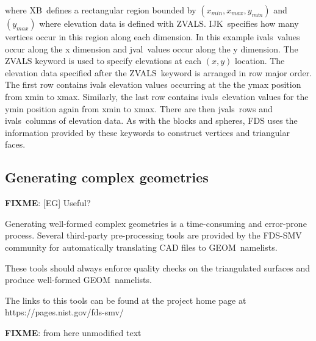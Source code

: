 \documentclass[12pt]{article}
\begin{document}
\noindent where {\ct XB}\ defines a rectangular region bounded by $(x_{min}, x_{max}, y_{min})$ and $(y_{max})$
where elevation data is defined with {\ct ZVALS}.
{\ct IJK}\ specifies how many vertices occur in this region along each dimension.
In this example {\ct ivals}\ values occur along the x dimension and {\ct jval}\ values occur along the y dimension.
The {\ct ZVALS} keyword is used to specify elevations at each $(x,y)$ location.
The elevation data specified after the {\ct ZVALS}\ keyword is arranged in row major order.
The first row contains {\ct ivals} elevation values occurring at the the ymax position from xmin to xmax.
Similarly, the last row contains
{\ct ivals}\ elevation values for the ymin position again from xmin to xmax.
There are then {\ct jvals}\ rows and {\ct ivals}\ columns of elevation data.
As with the blocks and spheres, FDS uses the information provided by these keywords to construct
vertices and triangular faces.

\subsection{Generating complex geometries}

\textbf{FIXME}: [EG] Useful?

Generating well-formed complex geometries is a time-consuming and error-prone process.
Several third-party pre-processing tools are provided by the FDS-SMV community for automatically translating CAD files to {\ct GEOM}\ namelists.

These tools should always enforce quality checks on the triangulated surfaces and produce well-formed {\ct GEOM}\ namelists.

The links to this tools can be found at the project home page at https://pages.nist.gov/fds-smv/





\textbf{FIXME}: from here unmodified text
\end{document}
